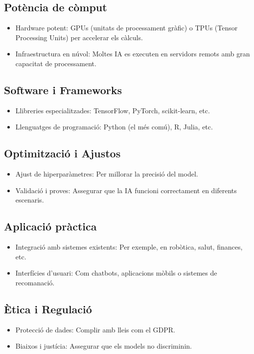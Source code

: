 \subsection{Potència de còmput}\label{subsec:Potència de còmput}
\begin{itemize}
 \item Hardware potent: GPUs (unitats de processament gràfic) o TPUs (Tensor Processing Units) per accelerar els càlculs.
 \item Infraestructura en núvol: Moltes IA es executen en servidors remots amb gran capacitat de processament.
\end{itemize}

\subsection{Software i Frameworks}\label{subsec:Software i Frameworks}
\begin{itemize}
 \item Llibreries especialitzades: TensorFlow, PyTorch, scikit-learn, etc.
 \item Llenguatges de programació: Python (el més comú), R, Julia, etc.
\end{itemize}

\subsection{Optimització i Ajustos}\label{subsec:Optimització i Ajustos}
\begin{itemize}
 \item Ajust de hiperparàmetres: Per millorar la precisió del model.
 \item Validació i proves: Assegurar que la IA funcioni correctament en diferents escenaris.
\end{itemize}
\subsection{Aplicació pràctica}\label{subsec:Aplicació pràctica}
\begin{itemize}
 \item Integració amb sistemes existents: Per exemple, en robòtica, salut, finances, etc.
 \item Interfícies d'usuari: Com chatbots, aplicacions mòbils o sistemes de recomanació.
\end{itemize}
\subsection{Ètica i Regulació}\label{subsec:Ètica i Regulació}
\begin{itemize}
 \item Protecció de dades: Complir amb lleis com el GDPR.
 \item Biaixos i justícia: Assegurar que els models no discriminin.
\end{itemize}

